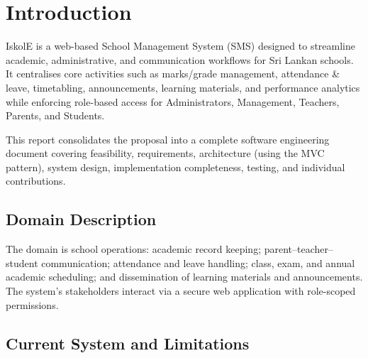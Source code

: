 \documentclass[12pt, a4paper]{report}
\begin{document}
\tableofcontents
\newpage

\listoffigures
\newpage

\listoftables
\newpage

\chapter{Introduction}

IskolE is a web-based School Management System (SMS) designed to streamline academic, administrative, and communication workflows for Sri Lankan schools. It centralises core activities such as marks/grade management, attendance \& leave, timetabling, announcements, learning materials, and performance analytics while enforcing role-based access for Administrators, Management, Teachers, Parents, and Students.

This report consolidates the proposal into a complete software engineering document covering feasibility, requirements, architecture (using the MVC pattern), system design, implementation completeness, testing, and individual contributions.

\section{Domain Description}

The domain is school operations: academic record keeping; parent--teacher--student communication; attendance and leave handling; class, exam, and annual academic scheduling; and dissemination of learning materials and announcements. The system's stakeholders interact via a secure web application with role-scoped permissions.

\section{Current System and Limitations}
\end{document}
